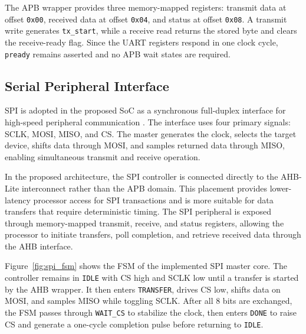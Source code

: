 \documentclass[runningheads]{llncs}
\begin{document}
The APB wrapper provides three memory-mapped registers: transmit data at offset \texttt{0x00}, received data at offset \texttt{0x04}, and status at offset \texttt{0x08}. A transmit write generates \texttt{tx\_start}, while a receive read returns the stored byte and clears the receive-ready flag. Since the UART registers respond in one clock cycle, \texttt{pready} remains asserted and no APB wait states are required.

\subsection{Serial Peripheral Interface}

SPI is adopted in the proposed SoC as a synchronous full-duplex interface for high-speed peripheral communication \cite{mazidi2018,spiblockguide}. The interface uses four primary signals: SCLK, MOSI, MISO, and CS. The master generates the clock, selects the target device, shifts data through MOSI, and samples returned data through MISO, enabling simultaneous transmit and receive operation.

In the proposed architecture, the SPI controller is connected directly to the AHB-Lite interconnect rather than the APB domain. This placement provides lower-latency processor access for SPI transactions and is more suitable for data transfers that require deterministic timing. The SPI peripheral is exposed through memory-mapped transmit, receive, and status registers, allowing the processor to initiate transfers, poll completion, and retrieve received data through the AHB interface.

Figure~\ref{fig:spi_fsm} shows the FSM of the implemented SPI master core. The controller remains in \texttt{IDLE} with CS high and SCLK low until a transfer is started by the AHB wrapper. It then enters \texttt{TRANSFER}, drives CS low, shifts data on MOSI, and samples MISO while toggling SCLK. After all 8 bits are exchanged, the FSM passes through \texttt{WAIT\_CS} to stabilize the clock, then enters \texttt{DONE} to raise CS and generate a one-cycle completion pulse before returning to \texttt{IDLE}.
\end{document}
